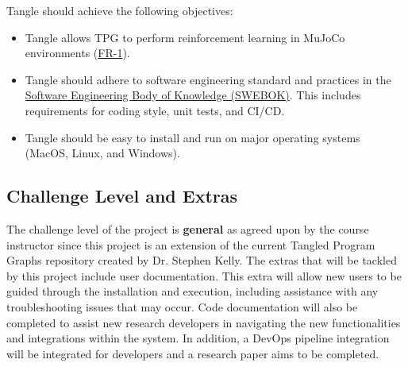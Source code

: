 \documentclass[12pt, titlepage]{article}
\begin{document}
Tangle should achieve the following objectives:
\begin{itemize}
\item Tangle allows TPG to perform reinforcement learning in MuJoCo environments (\href{https://github.com/TPGEngine/tpg/blob/main/docs/SRS/SRS.pdf}{FR-1}).
\item Tangle should adhere to software engineering standard and practices in the \href{https://www.computer.org/education/bodies-of-knowledge/software-engineering}{Software Engineering Body of Knowledge (SWEBOK)}. This includes requirements for coding style, unit tests, and CI/CD.
\item Tangle should be easy to install and run on major operating systems (MacOS, Linux, and Windows).
\end{itemize}

\subsection{Challenge Level and Extras}



The challenge level of the project is \textbf{general} as agreed upon by the course instructor since this project is an extension of the current Tangled Program Graphs repository created by Dr. Stephen Kelly. The extras that will be tackled by this project include user documentation. This extra will allow new users to be guided through the installation and execution, including assistance with any troubleshooting issues that may occur. Code documentation will also be completed to assist new research developers in navigating the new functionalities and integrations within the system. In addition, a DevOps pipeline integration will be integrated for developers and a research paper aims to be completed. 
\end{document}
